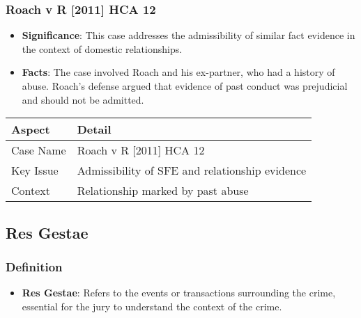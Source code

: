 \subsubsection{Roach v R {[}2011{]} HCA 12}\label{roach-v-r-2011-hca-12}

\begin{itemize}
\tightlist
\item
  \textbf{Significance}: This case addresses the admissibility of
  similar fact evidence in the context of domestic relationships.
\item
  \textbf{Facts}: The case involved Roach and his ex-partner, who had a
  history of abuse. Roach's defense argued that evidence of past conduct
  was prejudicial and should not be admitted.
\end{itemize}

\begin{longtable}[]{@{}
  >{\raggedright\arraybackslash}p{}
  >{\raggedright\arraybackslash}p{}@{}}
\toprule\noalign{}
\begin{minipage}[b]{\linewidth}\raggedright
Aspect
\end{minipage} & \begin{minipage}[b]{\linewidth}\raggedright
Detail
\end{minipage} \\
\midrule\noalign{}
\endhead
\bottomrule\noalign{}
\endlastfoot
Case Name & Roach v R {[}2011{]} HCA 12 \\
Key Issue & Admissibility of SFE and relationship evidence \\
Context & Relationship marked by past abuse \\
\end{longtable}

\subsection{  Res Gestae}\label{res-gestae}

\subsubsection{Definition}\label{definition-2}

\begin{itemize}
\tightlist
\item
  \textbf{Res Gestae}: Refers to the events or transactions surrounding
  the crime, essential for the jury to understand the context of the
  crime.
\end{itemize}

